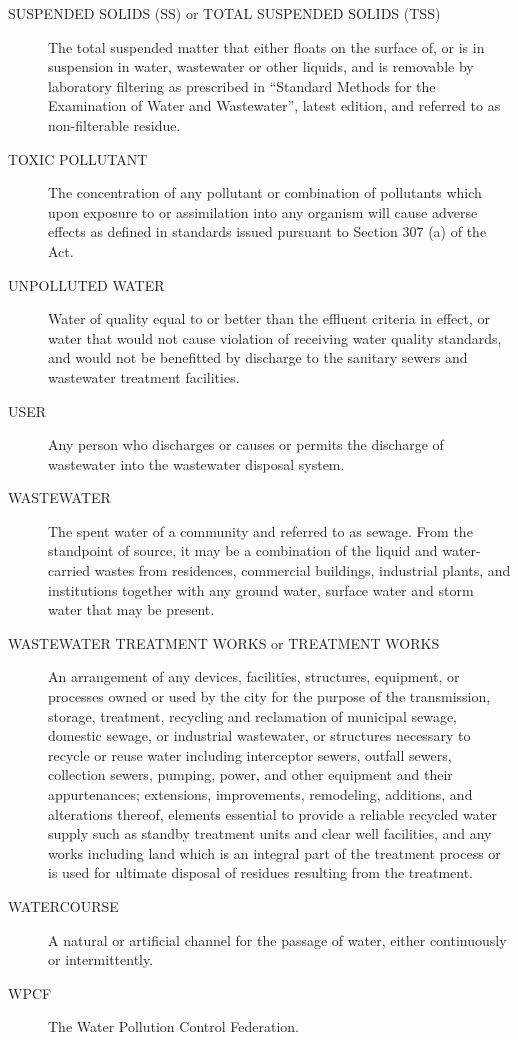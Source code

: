 \begin{description}
\item[SUSPENDED SOLIDS (SS) or TOTAL SUSPENDED SOLIDS (TSS)] The total suspended matter that either floats on the surface of, or is in suspension in water, wastewater or other liquids, and is removable by laboratory filtering as prescribed in “Standard Methods for the Examination of Water and Wastewater”, latest edition, and referred to as non-filterable residue.
\item[TOXIC POLLUTANT] The concentration of any pollutant or combination of pollutants which upon exposure to or assimilation into any organism will cause adverse effects as defined in standards issued pursuant to Section 307 (a) of the Act.
\item[UNPOLLUTED WATER] Water of quality equal to or better than the effluent criteria in effect, or water that would not cause violation of receiving water quality standards, and would not be benefitted by discharge to the sanitary sewers and wastewater treatment facilities.
\item[USER] Any person who discharges or causes or permits the discharge of wastewater into the wastewater disposal system.
\item[WASTEWATER] The spent water of a community and referred to as sewage.  From the standpoint of source, it may be a combination of the liquid and water-carried wastes from residences, commercial buildings, industrial plants, and institutions together with any ground water, surface water and storm water that may be present.
\item[WASTEWATER TREATMENT WORKS or TREATMENT WORKS] An arrangement of any devices, facilities, structures, equipment, or processes owned or used by the city for the purpose of the transmission, storage, treatment, recycling and reclamation of municipal sewage, domestic sewage, or industrial wastewater, or structures necessary to recycle or reuse water including interceptor sewers, outfall sewers, collection sewers, pumping, power, and other equipment and their appurtenances; extensions, improvements, remodeling, additions, and alterations thereof, elements essential to provide a reliable recycled water supply such as standby treatment units and clear well facilities, and any works including land which is an integral part of the treatment process or is used for ultimate disposal of residues resulting from the treatment.
\item[WATERCOURSE] A natural or artificial channel for the passage of water, either continuously or intermittently.
\item[WPCF] The Water Pollution Control Federation.
\end{description}

